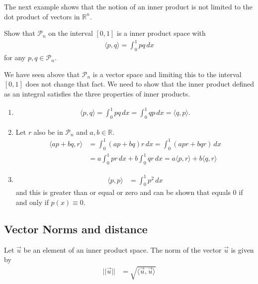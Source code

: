 The next example shows that the notion of an inner product is not limited to the dot product of vectors in $\mathbb{R}^n$. 

\begin{example}
Show that $\mathcal{P}_n$ on the interval $[0,1]$ is a inner product space with 
%
\begin{align*}
\langle p,q \rangle = \int_0^1 p q \, dx 
\end{align*}
for any $p, q \in \mathcal{P}_n$.  

\solution

We have seen above that $\mathcal{P}_n$ is a vector space and limiting this to the interval $[0,1]$ does not change that fact.  We need to show that the inner product defined as an integral satisfies the three properties of inner products. 

\begin{enumerate}
\item 
%
\begin{align*}
\langle p, q \rangle =  \int_0^1 pq \, dx =  \int_0^1 q p \, dx = \langle q, p \rangle. 
\end{align*}
\item Let $r$ also be in $\mathcal{P}_n$ and $a,b \in \mathbb{R}$.  
%
\begin{align*}
\langle ap+bq,r \rangle & = \int_0^1 (ap+bq)r \, dx = \int_0^1 (apr+bqr) \,dx \\
& = a \int_0^1 pr \, dx + b \int_0^1 qr \, dx = a \langle p,r \rangle + b \langle q,r \rangle
\end{align*}

\item 
%
\begin{align*}
\langle p, p \rangle & = \int_0^1 p^2 \, dx 
\end{align*}
and this is greater than or equal or zero and can be shown that equals 0 if and only if $p(x)\equiv 0$. 
\end{enumerate}

\end{example}

\subsection{Vector Norms and distance}

\begin{definition}
 Let $\vec{u}$ be an element of an inner product space.  The norm of the vector $\vec{u}$ is given by
\begin{align*}
 || \vec{u} || & = \sqrt{\langle \vec{u},\vec{u} \rangle}  
\end{align*}

\end{definition}

